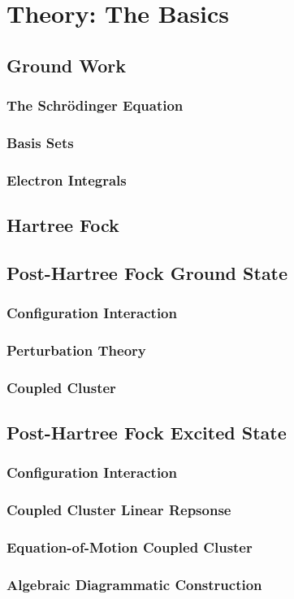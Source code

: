 \chapter{Theory: The Basics}

\section{Ground Work}

\subsection{The Schrödinger Equation}

\subsection{Basis Sets}

\subsection{Electron Integrals}

\section{Hartree Fock}

\section{Post-Hartree Fock Ground State}

\subsection{Configuration Interaction}

\subsection{Perturbation Theory}

\subsection{Coupled Cluster}

\section{Post-Hartree Fock Excited State}

\subsection{Configuration Interaction}

\subsection{Coupled Cluster Linear Repsonse}

\subsection{Equation-of-Motion Coupled Cluster}

\subsection{Algebraic Diagrammatic Construction}
